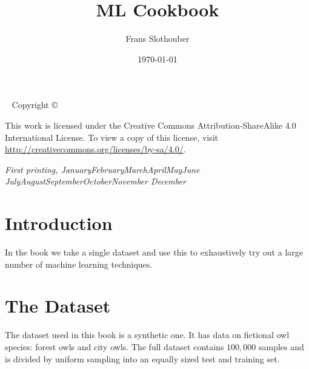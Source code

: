 \documentclass[11pt,a4paper,oldtoc,final]{tufte-book}
\title{ML Cookbook}
\author{Frans Slothouber}
\date{\today}
\newcommand{\blankpage}{\newpage\hbox{}\thispagestyle{empty}\newpage}
\newcommand{\monthyear}{%
  \ifcase\month\or January\or February\or March\or April\or May\or June\or
  July\or August\or September\or October\or November\or
  December\fi\space\number\year
}
\begin{document}
\frontmatter
\blankpage

\maketitle

\newpage
\begin{fullwidth}
~\vfill
\thispagestyle{empty}
\setlength{\parindent}{0pt}
\setlength{\parskip}{\baselineskip}
Copyright \copyright\ \the\year\ \thanklessauthor

\par{}


\par This work is licensed under the Creative Commons Attribution-ShareAlike
4.0 International License. To view a copy of this license, visit
\url{http://creativecommons.org/licenses/by-sa/4.0/}. 

\par\textit{First printing, \monthyear}
\end{fullwidth}

\tableofcontents

\listoffigures

\listoftables




\chapter*{Introduction}

In the book we take a single dataset and use this to 
exhaustively try out a large number of machine learning techniques.


\mainmatter

\chapter{The Dataset}

The dataset used in this book is a synthetic one.
It has data on fictional owl species: forest owls and city owls.
 
The full dataset contains $100,000$ samples and is divided by uniform sampling
into an equally sized test and training set.
\end{document}
